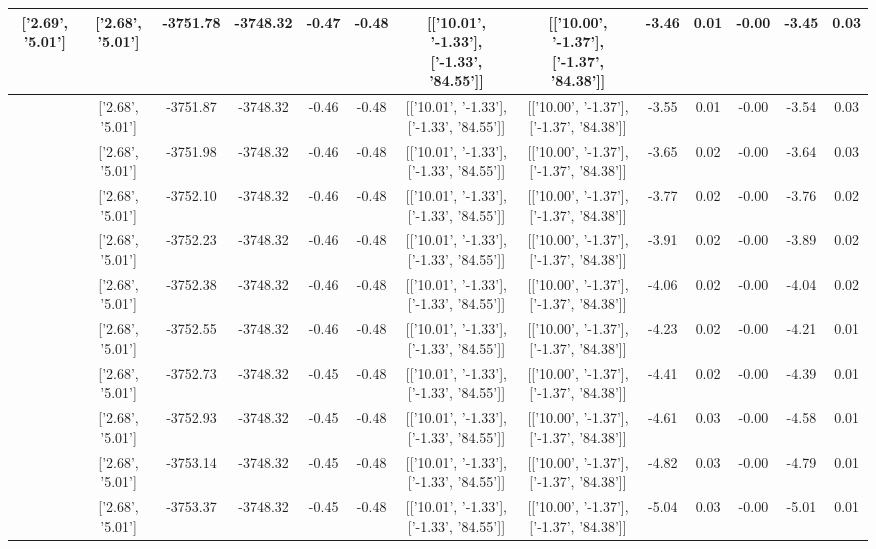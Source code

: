 \begin{table}[htbp]
\begin{adjustbox}{angle=90}
\begin{tabular}{|c|c|c|c|c|c|c|c|c|c|c|c|c|}
 ['2.69', '5.01'] & ['2.68', '5.01'] & -3751.78 & -3748.32 & -0.47 & -0.48 & [['10.01', '-1.33'], ['-1.33', '84.55']] & [['10.00', '-1.37'], ['-1.37', '84.38']] & -3.46 & 0.01 & -0.00 & -3.45 & 0.03\\ \hline
 ['2.69', '5.01'] & ['2.68', '5.01'] & -3751.87 & -3748.32 & -0.46 & -0.48 & [['10.01', '-1.33'], ['-1.33', '84.55']] & [['10.00', '-1.37'], ['-1.37', '84.38']] & -3.55 & 0.01 & -0.00 & -3.54 & 0.03\\ \hline
 ['2.69', '5.01'] & ['2.68', '5.01'] & -3751.98 & -3748.32 & -0.46 & -0.48 & [['10.01', '-1.33'], ['-1.33', '84.55']] & [['10.00', '-1.37'], ['-1.37', '84.38']] & -3.65 & 0.02 & -0.00 & -3.64 & 0.03\\ \hline
 ['2.70', '5.01'] & ['2.68', '5.01'] & -3752.10 & -3748.32 & -0.46 & -0.48 & [['10.01', '-1.33'], ['-1.33', '84.55']] & [['10.00', '-1.37'], ['-1.37', '84.38']] & -3.77 & 0.02 & -0.00 & -3.76 & 0.02\\ \hline
 ['2.70', '5.01'] & ['2.68', '5.01'] & -3752.23 & -3748.32 & -0.46 & -0.48 & [['10.01', '-1.33'], ['-1.33', '84.55']] & [['10.00', '-1.37'], ['-1.37', '84.38']] & -3.91 & 0.02 & -0.00 & -3.89 & 0.02\\ \hline
 ['2.70', '5.01'] & ['2.68', '5.01'] & -3752.38 & -3748.32 & -0.46 & -0.48 & [['10.01', '-1.33'], ['-1.33', '84.55']] & [['10.00', '-1.37'], ['-1.37', '84.38']] & -4.06 & 0.02 & -0.00 & -4.04 & 0.02\\ \hline
 ['2.70', '5.01'] & ['2.68', '5.01'] & -3752.55 & -3748.32 & -0.46 & -0.48 & [['10.01', '-1.33'], ['-1.33', '84.55']] & [['10.00', '-1.37'], ['-1.37', '84.38']] & -4.23 & 0.02 & -0.00 & -4.21 & 0.01\\ \hline
 ['2.70', '5.01'] & ['2.68', '5.01'] & -3752.73 & -3748.32 & -0.45 & -0.48 & [['10.01', '-1.33'], ['-1.33', '84.55']] & [['10.00', '-1.37'], ['-1.37', '84.38']] & -4.41 & 0.02 & -0.00 & -4.39 & 0.01\\ \hline
 ['2.70', '5.01'] & ['2.68', '5.01'] & -3752.93 & -3748.32 & -0.45 & -0.48 & [['10.01', '-1.33'], ['-1.33', '84.55']] & [['10.00', '-1.37'], ['-1.37', '84.38']] & -4.61 & 0.03 & -0.00 & -4.58 & 0.01\\ \hline
 ['2.70', '5.02'] & ['2.68', '5.01'] & -3753.14 & -3748.32 & -0.45 & -0.48 & [['10.01', '-1.33'], ['-1.33', '84.55']] & [['10.00', '-1.37'], ['-1.37', '84.38']] & -4.82 & 0.03 & -0.00 & -4.79 & 0.01\\ \hline
 ['2.70', '5.02'] & ['2.68', '5.01'] & -3753.37 & -3748.32 & -0.45 & -0.48 & [['10.01', '-1.33'], ['-1.33', '84.55']] & [['10.00', '-1.37'], ['-1.37', '84.38']] & -5.04 & 0.03 & -0.00 & -5.01 & 0.01\\ \hline

\end{tabular}
\end{adjustbox}
\end{table}
